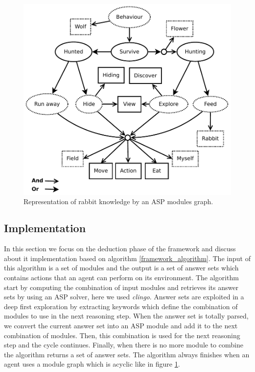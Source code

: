 \documentclass{aamas2012}
\begin{document}
	\begin{figure}
		\centering
		\includegraphics[keepaspectratio=true, scale=0.5]{modular_knowledge.pdf}
		\caption
		{
			\label{modular_knowledge}
			Representation of rabbit knowledge by an ASP modules graph.
		}
	\end{figure}
	
\subsection{Implementation}

	In this section we focus on the deduction phase of the framework and discuss about it implementation based on algorithm \ref{framework_algorithm}.
	The input of this algorithm is a set of modules and the output is a set of answer sets which contains actions that an agent can perform on its environment.
	The algorithm start by computing the combination of input modules and retrieves its answer sets by using an ASP solver, here we used \emph{clingo}.
	Answer sets are exploited in a deep first exploration by extracting keywords which define the combination of modules to use in the next reasoning step.
	When the answer set is totally parsed, we convert the current answer set into an ASP module and add it to the next combination of modules.
	Then, this combination is used for the next reasoning step and the cycle continues.
	Finally, when there is no more module to combine the algorithm returns a set of answer sets.
	The algorithm always finishes when an agent uses a module graph which is acyclic like in figure \ref{modular_knowledge}.
\end{document}
